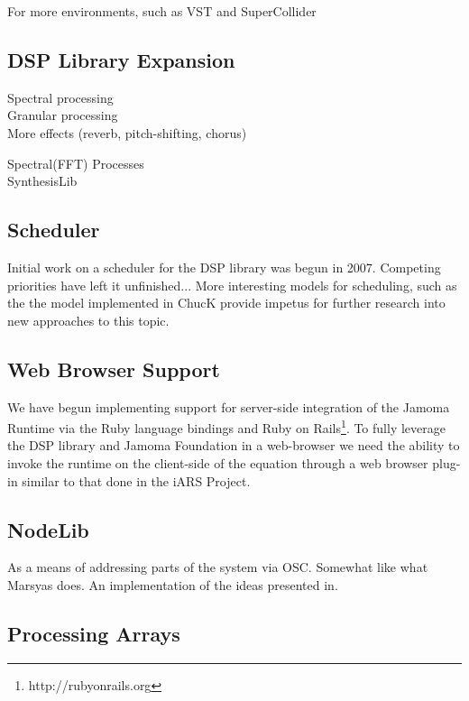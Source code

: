 \documentclass[twoside,10pt]{article}
\begin{document}
For more environments, such as VST and SuperCollider

\subsection{DSP Library Expansion}

Spectral processing \\

Granular processing   \\

More effects (reverb, pitch-shifting, chorus) 


Spectral(FFT) Processes\\

SynthesisLib

\subsection{Scheduler}

Initial work on a scheduler for the DSP library was begun in 2007.  Competing priorities have left it unfinished...  More interesting models for scheduling, such as the the model implemented in ChucK provide impetus for further research into new approaches to this topic.


\subsection{Web Browser Support}
We have begun implementing support for server-side integration of the Jamoma Runtime via the Ruby language bindings and Ruby on Rails\footnote{http://rubyonrails.org}.  To fully leverage the DSP library and Jamoma Foundation in a web-browser we need the ability to invoke the runtime on the client-side of the equation through a web browser plug-in similar to that done in the iARS Project\cite{Frauenberger:2003}.


\subsection{NodeLib}

As a means of addressing parts of the system via OSC.  Somewhat like what Marsyas does.  An implementation of the ideas presented in\cite{Place:2008osc}.


\subsection{Processing Arrays}
\end{document}
